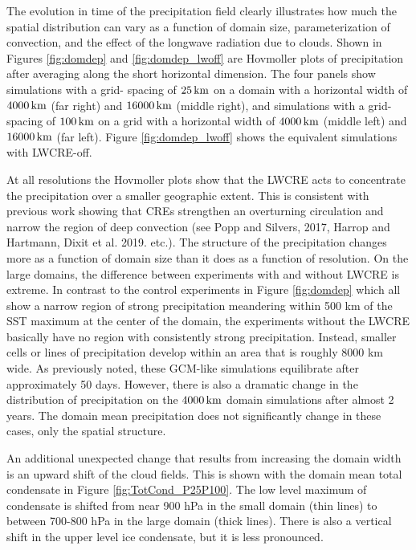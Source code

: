 \documentclass[draft]{agujournal2019}
\begin{document}
The evolution in time of the precipitation field clearly illustrates how much the spatial distribution can vary as a 
function of domain size, parameterization of convection, and the effect of the longwave radiation due to clouds. 
Shown in Figures {\ref{fig:domdep}} and {\ref{fig:domdep_lwoff}} are Hovmoller plots of precipitation after 
averaging along the short horizontal dimension.  The four panels show simulations with a grid-
spacing of $25\, \rm{km}$ on a domain with a horizontal width of $4000\, \rm{km}$ (far right) and $16000\, \rm{km}$ 
(middle right), and 
simulations with a grid-spacing of $100\, \rm{km}$ on a grid with a horizontal width of $4000\, \rm{km}$ (middle left) and 
$16000\, \rm{km}$ (far left).  Figure  {\ref{fig:domdep_lwoff}} shows the equivalent simulations with LWCRE-off.    

At all resolutions the Hovmoller plots show that the LWCRE acts to concentrate the 
precipitation over a smaller geographic extent.   This is consistent with previous work showing that CREs 
strengthen an overturning circulation and
narrow the region of deep convection (see Popp and Silvers, 2017, Harrop and Hartmann, Dixit et al. 2019.  etc.).
The structure of the precipitation changes more as a function of domain size than it does as a function of resolution. 
On the large domains, the difference between experiments with and without LWCRE is extreme.  In contrast to the control 
experiments in Figure {\ref{fig:domdep}} which all show a narrow region of strong precipitation 
meandering within 500 km of the SST maximum at the center of the domain,  
the experiments without the LWCRE basically have no region with consistently strong precipitation.  Instead, 
smaller cells or lines of precipitation develop within an area that is roughly 8000 km wide.  As previously noted, 
these GCM-like simulations equilibrate after approximately 50 days.  However, there is also a dramatic change in 
the distribution of precipitation on the $4000\, \rm{km}$ domain simulations after almost 2 years.   The domain mean 
precipitation does not significantly change in these cases, only the spatial structure. 

An additional unexpected change that results from increasing the domain width is an upward shift of the cloud fields.  This is 
shown with the domain mean total condensate in Figure \ref{fig:TotCond_P25P100}.  The  low level maximum of 
condensate is shifted from near 900 hPa in the small domain (thin lines) to between 700-800 hPa in 
the large domain (thick lines).  There is also a vertical shift in the upper level ice condensate, but it is less
pronounced.  
\end{document}
